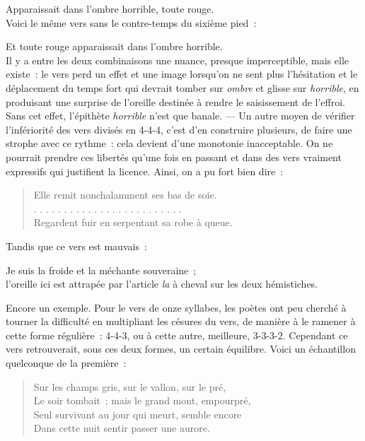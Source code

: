 \documentclass[french,twoside]{book} %
\begin{document}
Apparaissait dans l’ombre horrible, toute rouge.\\

\noindent Voici le même vers sans le contre-temps du sixième pied :\par

Et toute rouge apparaissait dans l’ombre horrible.\\

\noindent Il y a entre les deux combinaisons une nuance, presque imperceptible, mais elle existe : le vers perd un effet et une image lorsqu’on ne sent plus l’hésitation et le déplacement du temps fort qui devrait tomber sur \emph{ombre} et glisse sur \emph{horrible}, en produisant une surprise de l’oreille destinée à rendre le saisissement de l’effroi. Sans cet effet, l’épithète \emph{horrible} n’est que banale. — Un autre moyen de vérifier l’infériorité des vers divisés en 4-4-4, c’est d’en construire plusieurs, de faire une strophe avec ce rythme : cela devient d’une monotonie inacceptable. On ne pourrait prendre ces libertés qu’une fois en passant et dans des vers vraiment expressifs qui justifient la licence. Ainsi, on a pu fort bien dire :\par


\begin{verse}
Elle remit nonchalamment ses bas de soie.\\
. . . . . . . . . . . . . . . . . . . . . . . . .\\
Regardent fuir en serpentant sa robe à queue.\\
\end{verse}

\noindent Tandis que ce vers est mauvais :\par

Je suis la froide et la méchante souveraine ;\\

\noindent l’oreille ici est attrapée par l’article \emph{la} à cheval sur les deux hémistiches.\par
Encore un exemple. Pour le vers de onze syllabes, les poètes ont peu cherché à tourner la difficulté en multipliant les césures du vers, de manière à le ramener à cette forme régulière : 4-4-3, ou à cette autre, meilleure, 3-3-3-2. Cependant ce vers retrouverait, sous ces deux formes, un certain équilibre. Voici un échantillon quelconque de la première :\par


\begin{verse}
Sur les champs gris, sur le vallon, sur le pré,\\
Le soir tombait ; mais le grand mont, empourpré,\\
Seul survivant au jour qui meurt, semble encore\\
Dans cette nuit sentir passer une aurore.\\
\end{verse}
\end{document}
